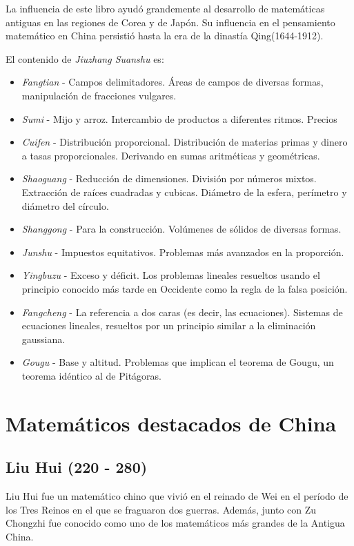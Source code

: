\documentclass[a4paper, 11pt]{article}
\begin{document}
		La influencia de este libro ayudó grandemente al desarrollo de matemáticas antiguas en las regiones de Corea y de
		Japón. Su influencia en el pensamiento matemático en China persistió hasta la era de la dinastía Qing(1644-1912).
		
		El contenido de \textit{Jiuzhang Suanshu} es:
		\begin{itemize}
			\item \textit{Fangtian} - Campos delimitadores. Áreas de campos de diversas formas, manipulación de fracciones vulgares.
			\item \textit{Sumi} - Mijo y arroz. Intercambio de productos a diferentes ritmos. Precios
			\item \textit{Cuifen} - Distribución proporcional. Distribución de materias primas y dinero a tasas proporcionales. Derivando en sumas aritméticas y geométricas.
			\item \textit{Shaoguang} - Reducción de dimensiones. División por números mixtos. Extracción de raíces cuadradas y cubicas. Diámetro de la esfera, perímetro y diámetro del círculo.
			\item \textit{Shanggong} - Para la construcción. Volúmenes de sólidos de diversas formas.
			\item \textit{Junshu} - Impuestos equitativos. Problemas más avanzados en la proporción.
			\item \textit{Yingbuzu} - Exceso y déficit. Los problemas lineales resueltos usando el principio conocido más tarde en Occidente como la regla de la falsa posición.
			\item \textit{Fangcheng} - La referencia a dos caras (es decir, las ecuaciones). Sistemas de ecuaciones lineales, resueltos por un principio similar a la eliminación gaussiana.
			\item \textit{Gougu} - Base y altitud. Problemas que implican el teorema de Gougu, un teorema idéntico al de Pitágoras.
		\end{itemize}
		
\section{Matemáticos destacados de China}

	\subsection{Liu Hui (220 - 280)}
		Liu Hui fue un matemático chino que vivió en el reinado de Wei en el período de los Tres Reinos en el que se
		fraguaron dos guerras. Además, junto con Zu Chongzhi fue conocido como uno de los matemáticos más grandes de la
		Antigua China.
\end{document}
